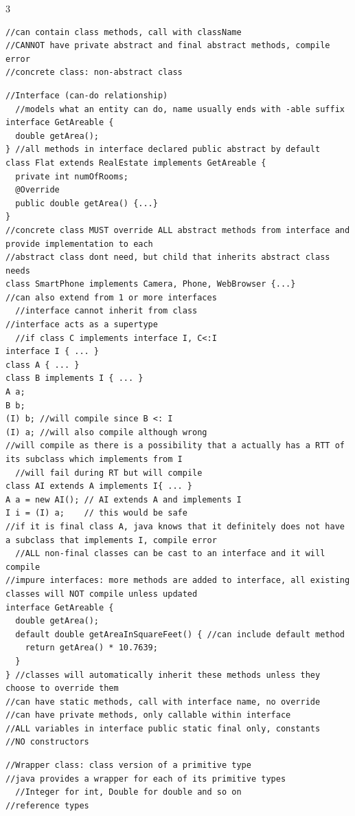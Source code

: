 \documentclass[10pt,a4paper]{article}
\begin{document}
\begin{multicols*}{3}
\begin{verbatim}
//can contain class methods, call with className
//CANNOT have private abstract and final abstract methods, compile error
//concrete class: non-abstract class
\end{verbatim}
\begin{verbatim}
//Interface (can-do relationship)
  //models what an entity can do, name usually ends with -able suffix
interface GetAreable {
  double getArea();
} //all methods in interface declared public abstract by default
class Flat extends RealEstate implements GetAreable {
  private int numOfRooms;
  @Override
  public double getArea() {...}
}
//concrete class MUST override ALL abstract methods from interface and provide implementation to each
//abstract class dont need, but child that inherits abstract class needs
class SmartPhone implements Camera, Phone, WebBrowser {...}
//can also extend from 1 or more interfaces
  //interface cannot inherit from class
//interface acts as a supertype
  //if class C implements interface I, C<:I
interface I { ... }
class A { ... }
class B implements I { ... }
A a;
B b;
(I) b; //will compile since B <: I
(I) a; //will also compile although wrong
//will compile as there is a possibility that a actually has a RTT of its subclass which implements from I
  //will fail during RT but will compile
class AI extends A implements I{ ... }
A a = new AI(); // AI extends A and implements I
I i = (I) a;    // this would be safe
//if it is final class A, java knows that it definitely does not have a subclass that implements I, compile error
  //ALL non-final classes can be cast to an interface and it will compile
//impure interfaces: more methods are added to interface, all existing classes will NOT compile unless updated
interface GetAreable {
  double getArea();
  default double getAreaInSquareFeet() { //can include default method
    return getArea() * 10.7639;
  }
} //classes will automatically inherit these methods unless they choose to override them
//can have static methods, call with interface name, no override
//can have private methods, only callable within interface
//ALL variables in interface public static final only, constants
//NO constructors
\end{verbatim}
\begin{verbatim}
//Wrapper class: class version of a primitive type
//java provides a wrapper for each of its primitive types
  //Integer for int, Double for double and so on
//reference types

\end{verbatim}
\end{multicols*}
\end{document}
